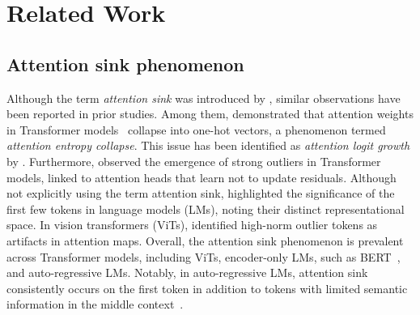 
\clearpage

\appendix

\section{Related Work}\label{related_work}

\vspace{-0.05cm}
\subsection{Attention sink phenomenon} 
\vspace{-0.05cm}
Although the term \textit{attention sink} was introduced by \citet{xiao2023efficient}, similar observations have been reported in prior studies. Among them, \citet{zhai2023stabilizing} demonstrated that attention weights in Transformer models~\citep{vaswani2017attention} collapse into one-hot vectors, a phenomenon termed \textit{attention entropy collapse}. This issue has been identified as \textit{attention logit growth} by \citet{wortsman2023small, dehghani2023scaling}. Furthermore, \citet{bondarenko2023quantizable} observed the emergence of strong outliers in Transformer models, linked to attention heads that learn not to update residuals. Although not explicitly using the term attention sink, \citet{han2024lm} highlighted the significance of the first few tokens in language models (LMs), noting their distinct representational space. In vision transformers (ViTs), \citet{darcet2023vision} identified high-norm outlier tokens as artifacts in attention maps. Overall, the attention sink phenomenon is prevalent across Transformer models, including ViTs, encoder-only LMs, such as BERT~\citep{devlin2019bert}, and auto-regressive LMs. Notably, in auto-regressive LMs, attention sink consistently occurs on the first token in addition to tokens with limited semantic information in the middle context~\citep{sun2024massive,yu2024unveiling}.

\vspace{-0.05cm}
